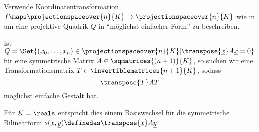 \begin{ziel*}
  Verwende Koordinatentransformation \( f\maps \projectionspaceover{n}{K}\to\projectionspaceover{n}{K} \) wie in  um eine projektive Quadrik \( Q \) in \enquote{möglichst einfacher Form} zu beschreiben.
\end{ziel*}
Ist \( Q=\Set{(x_0,\dotsc,x_n)\in \projectionspaceover{n}{K}|\transpose{\underline{x}}A\underline{x}=0} \) für eine symmetrische Matrix \( A\in \sqmatrices{(n+1)}{K} \), so suchen wir eine Transformationsmatrix \( T\in \invertiblematrices{n+1}{K} \), sodass
\begin{equation*}
  \transpose{T}AT
\end{equation*}
möglichst einfache Gestalt hat.
\begin{bemerkung*}
  Für \( K=\reals \) entspricht dies einem Basiswechsel für die symmetrische Bilinearform \( s(\underline{x},\underline{y})\definedas \transpose{\underline{x}}A\underline{y} \).
\end{bemerkung*}
